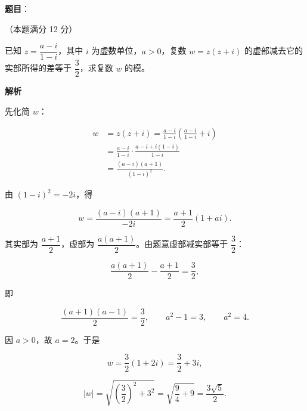 \begin{answer}

\textbf{题目}：

（本题满分 12 分）

已知 $z=\dfrac{a-i}{1-i}$，其中 $i$ 为虚数单位，$a>0$，复数 $w=z(z+i)$ 的虚部减去它的实部所得的差等于 $\dfrac32$，求复数 $w$ 的模。

\textbf{解析}

先化简 $w$：

\nopagebreak[4]
\[
\begin{aligned}
w&=z(z+i)=\frac{a-i}{1-i}\left(\frac{a-i}{1-i}+i\right)\\
&=\frac{a-i}{1-i}\cdot\frac{a-i+i(1-i)}{1-i}\\
&=\frac{(a-i)(a+1)}{(1-i)^2}.
\end{aligned}
\]

由 $(1-i)^2=-2i$，得

\nopagebreak[4]
\[
w=\frac{(a-i)(a+1)}{-2i}
=\frac{a+1}{2}(1+ai).
\]

其实部为 $\dfrac{a+1}{2}$，虚部为 $\dfrac{a(a+1)}{2}$。由题意虚部减实部等于 $\dfrac32$：

\nopagebreak[4]
\[
\frac{a(a+1)}{2}-\frac{a+1}{2}=\frac32,
\]

即

\nopagebreak[4]
\[
\frac{(a+1)(a-1)}{2}=\frac32,\qquad a^2-1=3,\qquad a^2=4.
\]

因 $a>0$，故 $a=2$。于是

\nopagebreak[4]
\[
w=\frac32(1+2i)=\frac32+3i,
\]

\nopagebreak[4]
\[
|w|=\sqrt{\left(\frac32\right)^2+3^2}
=\sqrt{\frac94+9}
=\frac{3\sqrt5}{2}.
\]


\end{answer}
